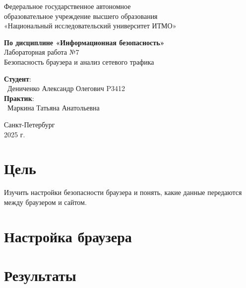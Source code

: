 \documentclass{article}
\begin{document}
\begin{center}
    \Large
    Федеральное государственное автономное \\
    образовательное учреждение высшего образования \\ 
    «Национальный исследовательский университет ИТМО»\\
    \vspace{0.5cm}
    \large
    
    \vspace{1cm}
    \Large
    \textbf{По дисциплине «Информационная безопасность»} \\
        Лабораторная работа №7\\
        Безопасность браузера и анализ сетевого
трафика
    \large
    \vspace{8cm}

    \begin{minipage}{.33\textwidth}
    \end{minipage}
    \hfill
    \begin{minipage}{.4\textwidth}
    
        \textbf{Студент}: \vspace{.1cm} \\
        \ Дениченко Александр Олегович P3412\\
        \textbf{Практик}:  \\
        \ Маркина Татьяна Анатольевна
    \end{minipage}
    \vfill
Санкт-Петербург\\ 2025 г.
\end{center}
\pagestyle{empty}
\newpage
\pagestyle{plain}

\section*{Цель}
Изучить настройки безопасности браузера и понять, какие данные передаются между
браузером и сайтом.

\section{Настройка браузера}





\section*{Результаты}
\end{document}
